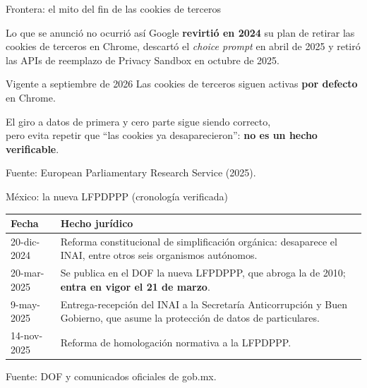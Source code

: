 \documentclass[aspectratio=169,xcolor=dvipsnames]{beamer}
\newcommand{\fuente}[1]{{\tiny\color{IPNgris}Fuente: #1}}
\begin{document}
\begin{frame}{Frontera: el mito del fin de las cookies de terceros}
\begin{alertblock}{Lo que se anunció no ocurrió así}
  \small Google \textbf{revirtió en 2024} su plan de retirar las cookies de terceros en Chrome, descartó el \textit{choice prompt} en abril de 2025 y retiró las APIs de reemplazo de Privacy Sandbox en octubre de 2025.
\end{alertblock}
\begin{block}{Vigente a septiembre de 2026}
  \small Las cookies de terceros siguen activas \textbf{por defecto} en Chrome.
\end{block}
\begin{center}
  El giro a datos de primera y cero parte sigue siendo correcto,\\
  pero evita repetir que \enquote{las cookies ya desaparecieron}: \textbf{no es un hecho verificable}.
\end{center}
\fuente{European Parliamentary Research Service (2025).}
\end{frame}

\begin{frame}{México: la nueva LFPDPPP (cronología verificada)}
\small
\begin{center}
\begin{tabular}{@{}>{\raggedright}p{2.2cm}>{\raggedright\arraybackslash}p{9.6cm}@{}}
\toprule
\textbf{Fecha} & \textbf{Hecho jurídico} \\
\midrule
20-dic-2024 & Reforma constitucional de simplificación orgánica: desaparece el INAI, entre otros seis organismos autónomos. \\
20-mar-2025 & Se publica en el DOF la nueva LFPDPPP, que abroga la de 2010; \textbf{entra en vigor el 21 de marzo}. \\
9-may-2025 & Entrega-recepción del INAI a la Secretaría Anticorrupción y Buen Gobierno, que asume la protección de datos de particulares. \\
14-nov-2025 & Reforma de homologación normativa a la LFPDPPP. \\
\bottomrule
\end{tabular}
\end{center}
\fuente{DOF y comunicados oficiales de gob.mx.}
\end{frame}
\end{document}
